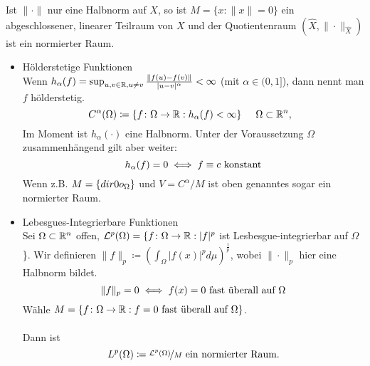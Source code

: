\begin{bemerkung}
	Ist $\| \cdot \|$ nur eine Halbnorm auf $X$, so ist $M = \{ x: \| x \| = 0 \}$ ein abgeschlossener, linearer Teilraum von $X$ und der Quotientenraum $(\hat X, \| \cdot \|_{\hat X})$ ist ein normierter Raum.
\end{bemerkung}
\newcommand{\rquot}[2]{\raisebox{0.5ex}{$#1$}\!/\!\raisebox{-0.5ex}{$#2$}}
\begin{beispiel}
	\begin{itemize}
		\item Hölderstetige Funktionen  \\
			Wenn $h_{\alpha}(f) = \sup_{u,v \in \mathbb{R}, u \neq v} \frac{\| f(u) - f(v)\|}{|u - v|^{\alpha}} < \infty$ (mit $\alpha \in (0, 1]$), dann nennt man $f$ hölderstetig.
			\[ C^{\alpha}(\Omega) \coloneqq \{ f \colon \Omega \rightarrow \mathbb{R}: h_{\alpha}(f) < \infty \} \hspace{0.5cm} \Omega \subset \mathbb{R}^{n}, \hspace{0.25cm} \]
			Im Moment ist $h_{\alpha}( \cdot )$ eine Halbnorm. Unter der Voraussetzung $\Omega$ zusammenhängend gilt aber weiter:
			\[ h_{\alpha}(f) = 0 \iff f \equiv c \text{ konstant} \]
			Wenn z.B. $M = \{ \1_\Omega \}$ und $V = C^{\alpha}/M$ ist oben genanntes sogar ein normierter Raum.
		\item Lebesgues-Integrierbare Funktionen  \\
			Sei $\Omega \subset \mathbb{R}^{n}$ offen, $\mathcal{L}^{p}(\Omega) = \{ f \colon \Omega \rightarrow \mathbb{R} : |f|^{p}$ ist Lesbesgue-integrierbar auf $\Omega$  \}.
			Wir definieren $\| f \|_{p} \coloneqq \left( \int_{\Omega} |f(x)|^{p} d\mu \right)^{\frac{1}{p}}$, wobei $\| \cdot \|_{p}$ hier eine Halbnorm bildet.
			\[ \| f \|_{p} = 0 \iff  f(x) = 0 \text{ fast überall auf } \Omega \]
			Wähle $M = \{ f \colon \Omega \rightarrow \mathbb{R}: f = 0 \text{ fast überall auf } \Omega \}$. \\ \\
			Dann ist 
			\[ L^{p}(\Omega) \coloneqq \nicefrac{ \mathcal{L}^{p}(\Omega) }{ M } \text{ ein normierter Raum.} \]
	\end{itemize}
\end{beispiel}



\newpage